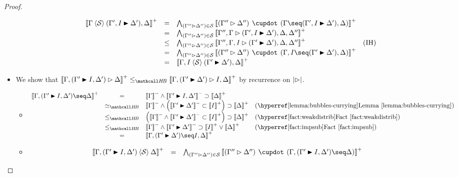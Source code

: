 \begin{proof}
\begin{itemize}
\begin{itemize}
$$\begin{array}{rcll}
        \psint{\Gamma \piq{\cS} (\Gamma', I \JB \Delta'), \Delta}
        &=& \psintAndMix{(\Gamma'' \J \Delta'')}{\cS}{\Gamma}{(\Gamma', I \JB \Delta'), \Delta} & \\
        &=& \psintAnd{(\Gamma'' \J \Delta'')}{\cS}{\Gamma'', \Gamma \J (\Gamma', I \JB \Delta'), \Delta, \Delta''} & \\
        &\sement& \psintAnd{(\Gamma'' \J \Delta'')}{\cS}{\Gamma'', \Gamma, I \J (\Gamma' \JB \Delta'), \Delta, \Delta''} &\text{(IH)} \\
        &=& \psintAndMix{(\Gamma'' \J \Delta'')}{\cS}{\Gamma, I}{(\Gamma' \JB \Delta'), \Delta} & \\
        &=& \psint{\Gamma, I \piq{\cS} (\Gamma' \JB \Delta'), \Delta} & \\
      \end{array}
      $$
    \end{itemize}
    \item[{\rsf{f{+}{-}{\da}}}]
    We show that $\psint{\Gamma, (\Gamma' \JB I, \Delta') \J \Delta} \sementHB
    \psint{\Gamma, (\Gamma' \JB \Delta') \J I, \Delta}$ by recurrence on
    $\bradepth{\J}$.
    \begin{itemize}
      \item[\bcase]
      $$
      \begin{array}{rcll}
        \psint{\Gamma, (\Gamma' \JB I, \Delta') \seq \Delta}
        &=& \nsint{\Gamma} \land \nsint{\Gamma' \JB I, \Delta'} \limp \psint{\Delta} & \\
        &\semequiv_{\HeytingBrouwer}& \nsint{\Gamma} \land \left(\nsint{\Gamma' \JB \Delta'} \lsub \psint{I}\right) \limp \psint{\Delta} &\text{(\reflemma{bubbles-currying})} \\
        &\sementHB& \left(\nsint{\Gamma} \land \nsint{\Gamma' \JB \Delta'} \lsub \psint{I}\right) \limp \psint{\Delta} &\text{(\reffact{weakdistrib})} \\
        &\sementHB& \nsint{\Gamma} \land \nsint{\Gamma' \JB \Delta'} \limp \psint{I} \lor \psint{\Delta} &\text{(\reffact{impsub})} \\
        &=& \psint{\Gamma, (\Gamma' \JB \Delta') \seq I, \Delta} & \\
      \end{array}
      $$
      \item[\rcase]
      $$
      \begin{array}{rcll}
        \psint{\Gamma, (\Gamma' \JB I, \Delta') \piq{\cS} \Delta}
        &=& \psintAndMix{(\Gamma'' \J \Delta'')}{\cS}{\Gamma, (\Gamma' \JB I, \Delta')}{\Delta} & \\

\end{array}$$
\end{itemize}
\end{itemize}
\end{proof}
